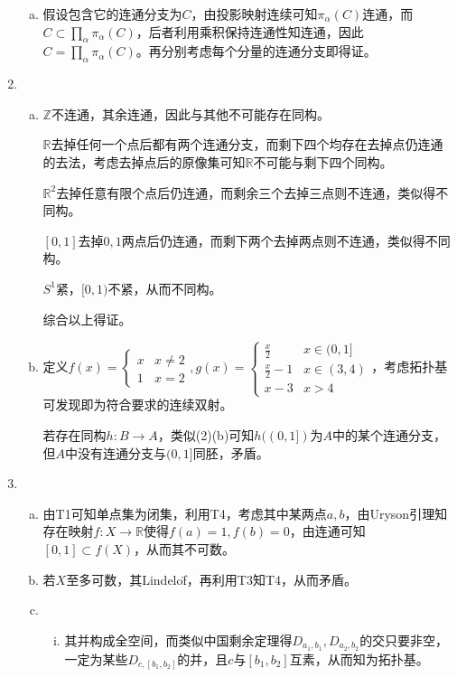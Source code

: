 \documentclass[a4paper,UTF8,fontset=windows]{ctexart}
\begin{document}
\begin{enumerate}[(1)]
\begin{enumerate}[(a)]
    \item
    假设包含它的连通分支为$C$，由投影映射连续可知$\pi_\alpha(C)$连通，而$C\subset\prod_\alpha\pi_\alpha(C)$，后者利用乘积保持连通性知连通，因此$C=\prod_\alpha\pi_\alpha(C)$。再分别考虑每个分量的连通分支即得证。
    \end{enumerate}
    
    \item
    \begin{enumerate}[(a)]
    \item
    $\mathbb{Z}$不连通，其余连通，因此与其他不可能存在同构。
    
    $\mathbb{R}$去掉任何一个点后都有两个连通分支，而剩下四个均存在去掉点仍连通的去法，考虑去掉点后的原像集可知$\mathbb{R}$不可能与剩下四个同构。
    
    $\mathbb{R}^2$去掉任意有限个点后仍连通，而剩余三个去掉三点则不连通，类似得不同构。
    
    $[0,1]$去掉$0,1$两点后仍连通，而剩下两个去掉两点则不连通，类似得不同构。
    
    $S^1$紧，$[0,1)$不紧，从而不同构。
    
    综合以上得证。
    
    \item
    定义$f(x)=\begin{cases}x&x\ne2\\1&x=2\end{cases},g(x)=\begin{cases}\frac{x}{2}&x\in(0,1]\\\frac{x}{2}-1&x\in(3,4)\\x-3&x>4\end{cases}$，考虑拓扑基可发现即为符合要求的连续双射。
    
    若存在同构$h:B\to A$，类似(2)(b)可知$h((0,1])$为$A$中的某个连通分支，但$A$中没有连通分支与$(0,1]$同胚，矛盾。
    \end{enumerate}
    
    \item
    \begin{enumerate}[(a)]
    \item
    由T1可知单点集为闭集，利用T4，考虑其中某两点$a,b$，由Uryson引理知存在映射$f:X\to\mathbb{R}$使得$f(a)=1,f(b)=0$，由连通可知$[0,1]\subset f(X)$，从而其不可数。
    
    \item
    若$X$至多可数，其Lindelo\"f，再利用T3知T4，从而矛盾。
    
    \item
    \begin{enumerate}[(i)]
    \item
    其并构成全空间，而类似中国剩余定理得$D_{a_1,b_1},D_{a_2,b_2}$的交只要非空，一定为某些$D_{c,[b_1,b_2]}$的并，且$c$与$[b_1,b_2]$互素，从而知为拓扑基。
    

\end{enumerate}
\end{enumerate}
\end{enumerate}
\end{document}
